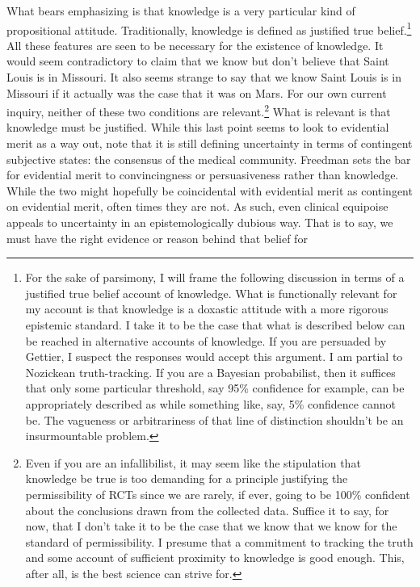 \documentclass[letterpaper,notitlepage,12pt]{article}
\begin{document}
What bears emphasizing is that knowledge is a very particular kind of
propositional attitude.
Traditionally, knowledge is defined as justified true belief.\footnote{For the
  sake of parsimony, I will frame the following discussion in terms of a
  justified true belief account of knowledge. What is functionally relevant for
  my account is that knowledge is a doxastic attitude with a more rigorous
  epistemic standard. I take it to be the case that what is described below can
  be reached in alternative accounts of knowledge. If you are persuaded by
  Gettier, I suspect the responses would accept this argument. I am partial to
  Nozickean truth-tracking. If you are a Bayesian probabilist, then it suffices
  that only some particular threshold, say 95\% confidence for example, can be
  appropriately described as  while something like, say,
  5\% confidence cannot be. The vagueness or arbitrariness of that line of
distinction shouldn't be an insurmountable problem.}
All these features are seen to be necessary for the existence of knowledge.
It would seem contradictory to claim that we know but don't believe that Saint
Louis is in Missouri.
It also seems strange to say that we know Saint Louis is in Missouri if it
actually was the case that it was on Mars.
For our own current inquiry, neither of these two conditions are
relevant.\footnote{Even if you are an infallibilist, it may seem like the
  stipulation that knowledge be true is too demanding for a principle justifying
  the permissibility of RCTs since we are rarely, if ever, going to be 100\%
  confident about the conclusions drawn from the collected data. Suffice it to
  say, for now, that I don't take it to be the case that we know that we know
  for the standard of permissibility. I presume that a commitment to tracking
  the truth and some account of sufficient proximity to knowledge is good enough.
  This, after all, is the best science can strive for.}
What is relevant is that knowledge must be justified.
While this last point seems to look to evidential merit as a way out, note that
it is still defining uncertainty in terms of contingent subjective states: the
consensus of the medical community.
Freedman sets the bar for evidential merit to convincingness or persuasiveness
rather than knowledge.
While the two might hopefully be coincidental with evidential merit as
contingent on evidential merit, often times they are not.
As such, even clinical equipoise appeals to uncertainty in an epistemologically
dubious way.
That is to say, we must have the right evidence or reason behind that belief for
\end{document}

